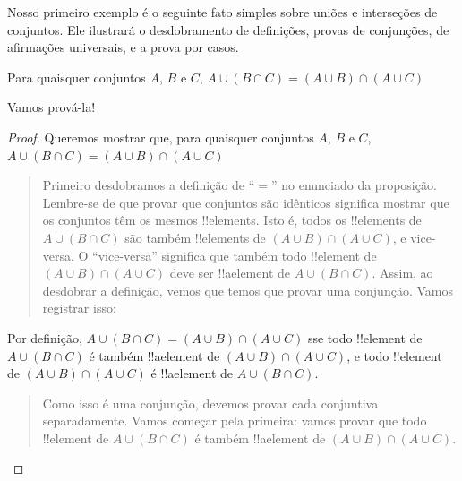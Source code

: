 \documentclass[../../../include/open-logic-section]{subfiles}
\begin{document}


Nosso primeiro exemplo é o seguinte fato simples sobre uniões e
interseções de conjuntos.  Ele ilustrará o desdobramento de definições,
provas de conjunções, de afirmações universais, e a prova por casos.

\begin{prop}
Para quaisquer conjuntos $A$, $B$ e $C$, $A \cup (B \cap C) = (A \cup B)
\cap (A \cup C)$
\end{prop}

Vamos prová-la!{}

\begin{proof}
Queremos mostrar que, para quaisquer conjuntos $A$, $B$ e $C$, $A \cup (B \cap
C) = (A \cup B) \cap (A \cup C)$
\begin{quote}
Primeiro desdobramos a definição de ``$=$'' no enunciado da
proposição. Lembre-se de que provar que conjuntos são idênticos significa mostrar que os
conjuntos têm os mesmos !!{element}s. Isto é, todos os !!{element}s de $A \cup
(B \cap C)$ são também !!{element}s de $(A \cup B) \cap (A \cup C)$, e
vice-versa.  O ``vice-versa'' significa que também todo !!{element} de $(A
\cup B) \cap (A \cup C)$ deve ser !!a{element} de $A \cup (B \cap
C)$.  Assim, ao desdobrar a definição, vemos que temos que provar uma
conjunção.  Vamos registrar isso:
\end{quote}
Por definição, $A \cup (B \cap C) = (A \cup B) \cap (A \cup C)$ sse
todo !!{element} de $A \cup (B \cap C)$ é também !!a{element} de $(A
\cup B) \cap (A \cup C)$, e todo !!{element} de $(A \cup B) \cap (A
\cup C)$ é !!a{element} de $A \cup (B \cap C)$.
\begin{quote}
Como isso é uma conjunção, devemos provar cada conjuntiva
separadamente. Vamos começar pela primeira: vamos provar que todo
!!{element} de $A \cup (B \cap C)$ é também !!a{element} de $(A
\cup B) \cap (A \cup C)$.


\end{quote}
\end{proof}
\end{document}
